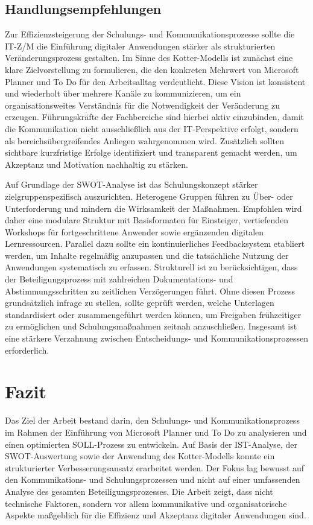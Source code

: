 \documentclass[
    12pt, 
    a4paper,
    ]{scrartcl} %
\begin{document}
\subsection{Handlungsempfehlungen}
Zur Effizienzsteigerung der Schulungs- und Kommunikationsprozesse sollte die IT-Z/M die Einführung digitaler Anwendungen stärker als strukturierten Veränderungsprozess gestalten. Im Sinne des Kotter-Modells ist zunächst eine klare Zielvorstellung zu formulieren, die den konkreten Mehrwert von Microsoft Planner und To Do für den Arbeitsalltag verdeutlicht. Diese Vision ist konsistent und wiederholt über mehrere Kanäle zu kommunizieren, um ein organisationsweites Verständnis für die Notwendigkeit der Veränderung zu erzeugen. Führungskräfte der Fachbereiche sind hierbei aktiv einzubinden, damit die Kommunikation nicht ausschließlich aus der IT-Perspektive erfolgt, sondern als bereichsübergreifendes Anliegen wahrgenommen wird. Zusätzlich sollten sichtbare kurzfristige Erfolge identifiziert und transparent gemacht werden, um Akzeptanz und Motivation nachhaltig zu stärken.

Auf Grundlage der SWOT-Analyse ist das Schulungskonzept stärker zielgruppenspezifisch auszurichten. Heterogene Gruppen führen zu Über- oder Unterforderung und mindern die Wirksamkeit der Maßnahmen. Empfohlen wird daher eine modulare Struktur mit Basisformaten für Einsteiger, vertiefenden Workshops für fortgeschrittene Anwender sowie ergänzenden digitalen Lernressourcen. Parallel dazu sollte ein kontinuierliches Feedbacksystem etabliert werden, um Inhalte regelmäßig anzupassen und die tatsächliche Nutzung der Anwendungen systematisch zu erfassen.
Strukturell ist zu berücksichtigen, dass der Beteiligungsprozess mit zahlreichen Dokumentations- und Abstimmungsschritten zu zeitlichen Verzögerungen führt. Ohne diesen Prozess grundsätzlich infrage zu stellen, sollte geprüft werden, welche Unterlagen standardisiert oder zusammengeführt werden können, um Freigaben frühzeitiger zu ermöglichen und Schulungsmaßnahmen zeitnah anzuschließen. Insgesamt ist eine stärkere Verzahnung zwischen Entscheidungs- und Kommunikationsprozessen erforderlich.

\section{Fazit}
Das Ziel der Arbeit bestand darin, den Schulungs- und Kommunikationsprozess im Rahmen der Einführung von Microsoft Planner und To Do zu analysieren und einen optimierten SOLL-Prozess zu entwickeln. Auf Basis der IST-Analyse, der SWOT-Auswertung sowie der Anwendung des Kotter-Modells konnte ein strukturierter Verbesserungsansatz erarbeitet werden. Der Fokus lag bewusst auf den Kommunikations- und Schulungsprozessen und nicht auf einer umfassenden Analyse des gesamten Beteiligungsprozesses. Die Arbeit zeigt, dass nicht technische Faktoren, sondern vor allem kommunikative und organisatorische Aspekte maßgeblich für die Effizienz und Akzeptanz digitaler Anwendungen sind.
\end{document}
